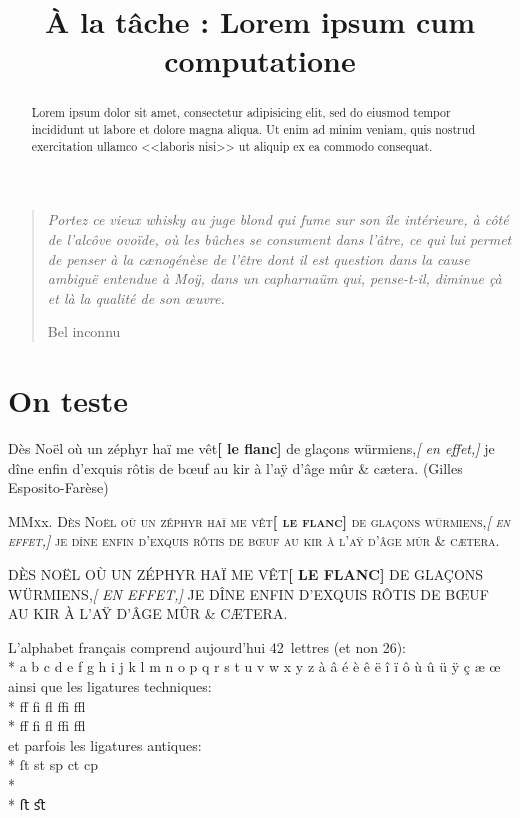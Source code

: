 \documentclass[a4paper,twoside,10pt,english,french]{article}   %
\title{À la tâche : Lorem ipsum cum computatione}
\author{Yves Roggeman~\thanks\thethanks}
\date{\DTMToday}
\theoremstyle{definition}
\theoremstyle{remark}
\theoremstyle{plain}
\newcounter{quest}
\begin{document}
%
\let\oldproofname=\proofname
\renewcommand{\proofname}{\bfseries\oldproofname}
\renewcommand{\listfigurename}{Liste des schémas}
\renewcommand{\listtablename}{Liste des tables}
\renewcommand{\lstlistingname}{Programme}
\renewcommand{\lstlistlistingname}{Liste des programmes}
%
\maketitle
%
\begin{abstract}
Lorem ipsum dolor sit amet, consectetur adipisicing elit, sed do eiusmod tempor incididunt ut labore et dolore magna aliqua. Ut enim ad minim veniam, quis nostrud exercitation ullamco <<laboris nisi>> ut aliquip ex ea commodo consequat.
\end{abstract}

\blockquote[Bel inconnu]{\sl Portez ce vieux whisky au juge blond qui fume sur son île intérieure, à côté de l’alcôve ovoïde, où les bûches se consument dans l’âtre, ce qui lui permet de penser à la cænogénèse de l’être dont il est question dans la cause ambiguë entendue à Moÿ, dans un capharnaüm qui, pense-t-il, diminue çà et là la qualité de son œuvre.}

\section{On teste}

Dès Noël où un zéphyr haï me vêt\textbf{[ le flanc]} de glaçons würmiens,\textit{[ en effet,]} je dîne enfin d'exquis rôtis de bœuf au kir à l'aÿ d'âge mûr \& cætera. (Gilles Esposito-Farèse)

M\textsc{Mx}x. \textsc{Dès Noël où un zéphyr haï me vêt\textbf{[ le flanc]} de glaçons würmiens,\textit{[ en effet,]} je dîne enfin d'exquis rôtis de bœuf au kir à l'aÿ d'âge mûr \& cætera.}

DÈS NOËL OÙ UN ZÉPHYR HAÏ ME VÊT\textbf{[ LE FLANC]} DE GLAÇONS WÜRMIENS,\textit{[ EN EFFET,]} JE DÎNE ENFIN D'EXQUIS RÔTIS DE BŒUF AU KIR À L'AŸ D'ÂGE MÛR \& CÆTERA.

\noindent L'alphabet français comprend aujourd'hui 42~lettres (et non 26): \\*
\indent a b c d e f g h i j k l m n o p q r s t u v w x y z
\hspace*{1cm} à â é è ê ë î ï ô ù û ü ÿ ç æ œ \\ 
ainsi que les ligatures techniques: \\*
\indent ff fi fl ffi ffl   \\*
\indent ﬀ  ﬁ  ﬂ  ﬃ   ﬄ  \\
et parfois les ligatures antiques: \\*
\indent ſt
st sp ct cp    \\*
 \\*
\indent ﬅ  ﬆ
\end{document}
